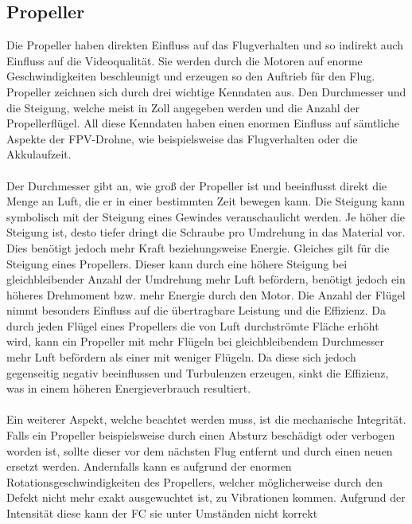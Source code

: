     \subsection[Propeller]{Propeller}
        Die Propeller haben direkten Einfluss auf das Flugverhalten und so indirekt auch Einfluss auf
        die Videoqualität. Sie werden durch die Motoren auf enorme Geschwindigkeiten beschleunigt und
        erzeugen so den Auftrieb für den Flug. Propeller zeichnen sich durch drei wichtige Kenndaten
        aus. Den Durchmesser und die Steigung, welche meist in Zoll angegeben werden und die Anzahl
        der Propellerflügel. All diese Kenndaten haben einen enormen Einfluss auf sämtliche Aspekte der
        FPV-Drohne, wie beispielsweise das Flugverhalten oder die Akkulaufzeit. \\
        \\
        Der Durchmesser gibt an, wie groß der Propeller ist und beeinflusst direkt die Menge an Luft,
        die er in einer bestimmten Zeit bewegen kann. Die Steigung kann symbolisch mit der Steigung
        eines Gewindes veranschaulicht werden. Je höher die Steigung ist, desto tiefer dringt die Schraube
        pro Umdrehung in das Material vor. Dies benötigt jedoch mehr Kraft beziehungsweise Energie. Gleiches
        gilt für die Steigung eines Propellers. Dieser kann durch eine höhere Steigung bei gleichbleibender
        Anzahl der Umdrehung mehr Luft befördern, benötigt jedoch ein höheres Drehmoment bzw. mehr Energie
        durch den Motor. Die Anzahl der Flügel nimmt besonders Einfluss auf die übertragbare Leistung und
        die Effizienz. Da durch jeden Flügel eines Propellers die von Luft durchströmte Fläche erhöht wird,
        kann ein Propeller mit mehr Flügeln bei gleichbleibendem Durchmesser mehr Luft befördern als einer
        mit weniger Flügeln. Da diese sich jedoch gegenseitig negativ beeinflussen und Turbulenzen erzeugen,
        sinkt die Effizienz, was in einem höheren Energieverbrauch resultiert.  \\
        \\
        Ein weiterer Aspekt, welche beachtet werden muss, ist die mechanische Integrität. Falls ein Propeller
        beispielsweise durch einen Absturz beschädigt oder verbogen worden ist, sollte dieser vor dem nächsten
        Flug entfernt und durch einen neuen ersetzt werden. Andernfalls kann es aufgrund der enormen
        Rotationsgeschwindigkeiten des Propellers, welcher möglicherweise durch den Defekt nicht mehr exakt ausgewuchtet
        ist, zu Vibrationen kommen. Aufgrund der Intensität diese kann der FC sie unter Umständen nicht korrekt
